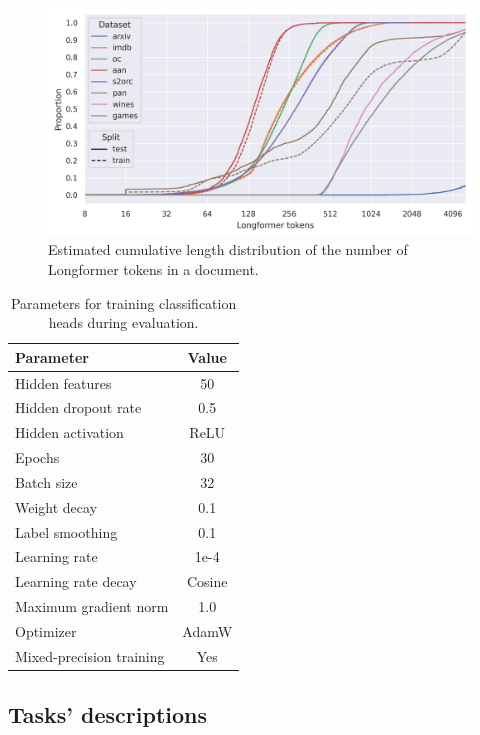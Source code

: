 \begin{figure}
    \includegraphics[width=\textwidth]{./img/eval_tasks_token_ecdf.png}

    \caption{Estimated cumulative length distribution of the number of
    Longformer tokens in a document.}

    \label{fig:eval_task_longformer_token_dist}
\end{figure}


\begin{table}
  \centering
  \begin{tabular}{l c}
    \toprule
    Parameter & Value \\
    \midrule
    Hidden features & 50 \\
    Hidden dropout rate & 0.5 \\
    Hidden activation & ReLU \\
    Epochs & 30 \\
    Batch size & 32 \\
    Weight decay & 0.1 \\
    Label smoothing & 0.1 \\
    Learning rate & 1e-4 \\
    Learning rate decay & Cosine \\
    Maximum gradient norm & 1.0 \\
    Optimizer & AdamW \\
    Mixed-precision training & Yes \\
    \bottomrule
  \end{tabular}

  \caption{Parameters for training classification heads during evaluation.}
  \label{table:head_train_eval_params}
\end{table}

\subsection{Tasks' descriptions}

